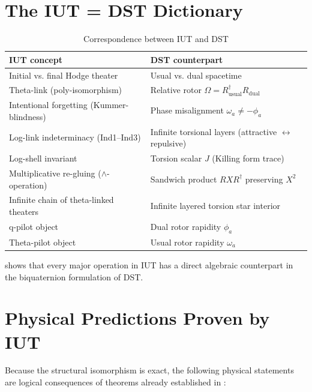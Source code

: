 \documentclass[dvipdfmx,11pt,a4paper]{article}
\begin{document}
\section{The IUT = DST Dictionary}

\begin{table}[ht]
\centering
\begin{tabular}{|l|l|}
\hline
\textbf{IUT concept} & \textbf{DST counterpart} \\
\hline
Initial vs. final Hodge theater & Usual vs. dual spacetime \\
Theta-link (poly-isomorphism) & Relative rotor $\Omega=R_{\text{usual}}^\dagger R_{\text{dual}}$ \\
Intentional forgetting (Kummer-blindness) & Phase misalignment $\omega_a\neq-\phi_a$ \\
Log-link indeterminacy (Ind1–Ind3) & Infinite torsional layers (attractive $\leftrightarrow$ repulsive) \\
Log-shell invariant & Torsion scalar $J$ (Killing form trace) \\
Multiplicative re-gluing ($\wedge$-operation) & Sandwich product $RXR^\dagger$ preserving $X^2$ \\
Infinite chain of theta-linked theaters & Infinite layered torsion star interior \\
q-pilot object & Dual rotor rapidity $\phi_a$ \\
Theta-pilot object & Usual rotor rapidity $\omega_a$ \\
\hline
\end{tabular}
\caption{Correspondence between IUT and DST}
\label{tab:dictionary}
\end{table}

 shows that every major operation in IUT has a direct algebraic counterpart in the biquaternion formulation of DST.

\section{Physical Predictions Proven by IUT}

Because the structural isomorphism is exact, the following physical statements are logical consequences of theorems already established in \cite{MochizukiIUT3,MochizukiIUT4}:
\end{document}
